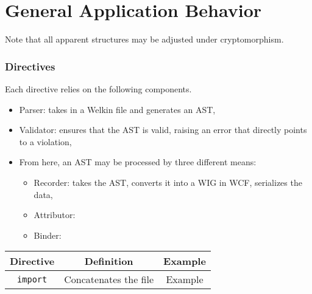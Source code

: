 \section{General Application Behavior}

Note that all apparent structures may be adjusted under cryptomorphism.
\subsubsection*{Directives}
Each directive relies on the following components.
\begin{itemize}
  \item Parser: takes in a Welkin file and generates an AST,
  \item Validator: ensures that the AST is valid, raising an error that directly points to a violation,
  \item From here, an AST may be processed by three different means:
		\begin{itemize}
		  \item Recorder: takes the AST, converts it into a WIG in WCF, serializes the data,
		  \item Attributor: %
		  \item Binder:
		\end{itemize}
\end{itemize}
\begin{center}
  \begin{tabular}{| c | c | c |}
	Directive & Definition & Example \\
	\hline
	\texttt{import} & Concatenates the file & Example

  \end{tabular}
\end{center}




